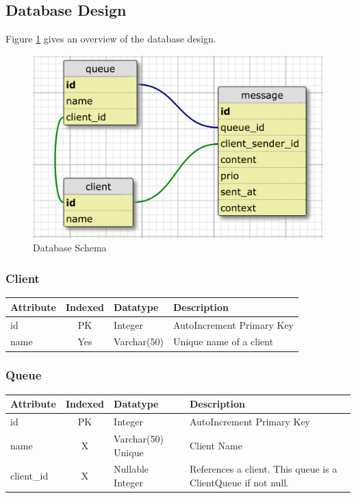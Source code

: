\documentclass[a4paper]{article}
\begin{document}
\pagebreak

\subsection{Database Design}
Figure \ref{fig:dbschema} gives an overview of the database design.


\begin{figure}[H]
	\begin{center}
    \includegraphics[scale=0.3]{../drawings/database-schema.png}
  \end{center}
  \caption{Database Schema}
  \label{fig:dbschema}
\end{figure}


\subsubsection{Client}
\begin{tabular}
{|>{\centering\arraybackslash}p{2.1cm}|c|>{\centering\arraybackslash}p{3cm}|p{7cm}|}
\hline 
\textbf{Attribute} & \textbf{Indexed} & \textbf{Datatype} & \textbf{Description} \\ 
\hline 
id & PK & Integer & AutoIncrement Primary Key \\ 
\hline 
name & Yes & Varchar(50) & Unique name of a client \\ 
\hline 
\end{tabular} 


\subsubsection{Queue}
\begin{tabular}
{|>{\centering\arraybackslash}p{2.1cm}|c|>{\centering\arraybackslash}p{3cm}|p{7cm}|}
\hline 
\textbf{Attribute} & \textbf{Indexed} & \textbf{Datatype} & \textbf{Description} \\ 
\hline 
id & PK & Integer & AutoIncrement Primary Key \\ 
\hline 
name & X & Varchar(50) Unique & Client Name \\ 
\hline 
client\_id & X & Nullable Integer & References a client. This queue is a ClientQueue if not null. \\ 
\hline 
\end{tabular} 
\end{document}
